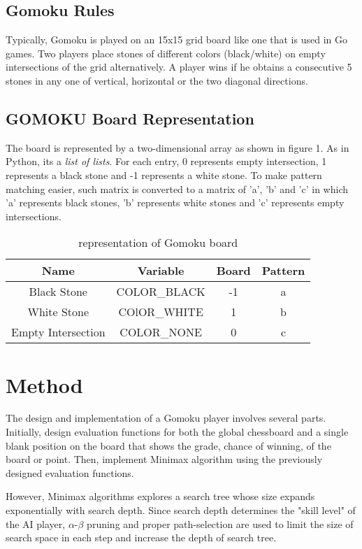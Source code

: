 \documentclass[conference]{IEEEtran}
\begin{document}
  \subsection{Gomoku Rules}
  Typically, Gomoku is played on an 15x15 grid board like one that is used in Go games. Two players place stones of different colors (black/white) on empty intersections of the grid alternatively. A player wins if he obtains a consecutive 5 stones in any one of vertical, horizontal or the two diagonal directions.  
  \subsection{GOMOKU Board Representation}
  The board is represented by a two-dimensional array as shown in figure 1. As in Python, its a \emph{list of lists}. For each entry, 0 represents empty intersection, 1 represents a black stone and -1 represents a white stone. To make pattern matching easier, such matrix is converted to a matrix of 'a', 'b' and 'c' in which 'a' represents black stones, 'b' represents white stones and 'c' represents empty intersections.
    
	\begin{table}[H]
	\caption{representation of Gomoku board}
	\centering
    \begin{tabular}{cccc}
    \toprule
    Name&Variable&Board&Pattern\\
    \midrule
    Black Stone&COLOR\_BLACK&-1&a\\
    White Stone&COlOR\_WHITE&1&b\\
    Empty Intersection&COLOR\_NONE&0&c\\
	\bottomrule
	\end{tabular}
	\label{table:1}
	\end{table}
  
\section{Method}
The design and implementation of a Gomoku player involves several parts. Initially, design evaluation functions for both the global chessboard and a single blank position on the board that shows the grade, chance of winning, of the board or point. Then, implement Minimax algorithm using the previously designed evaluation functions.

However, Minimax algorithms explores a search tree whose size expands exponentially with search depth. Since search depth determines the "skill level" of the AI player, $\alpha$-$\beta$ pruning and proper path-selection are used to limit the size of search space in each step and increase the depth of search tree.
\end{document}
